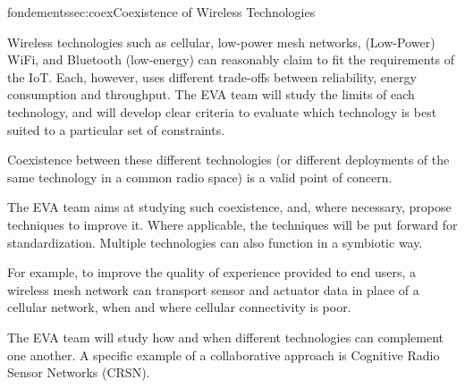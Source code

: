 \documentclass{ra2016}
\begin{document}
\begin{module}{fondements}{sec:coex}{Coexistence of Wireless Technologies}

Wireless technologies such as cellular, low-power mesh networks, (Low-Power) WiFi, and Bluetooth (low-energy) can reasonably claim to fit the requirements of the IoT. Each, however, uses different trade-offs between reliability, energy consumption and throughput. The EVA team will study the limits of each technology, and will develop clear criteria to evaluate which technology is best suited to a particular set of constraints.

Coexistence between these different technologies (or different deployments of the same technology in a common radio space) is a valid point of concern.

The EVA team aims at studying such coexistence, and, where necessary, propose techniques to improve it. Where applicable, the techniques will be put forward for standardization. Multiple technologies can also function in a symbiotic way.

For example, to improve the quality of experience provided to end users, a wireless mesh network can transport sensor and actuator data in place of a cellular network, when and where cellular connectivity is poor.

The EVA team will study how and when different technologies can complement one another.
A specific example of a collaborative approach is Cognitive Radio Sensor Networks (CRSN).

\end{module}
\end{document}

